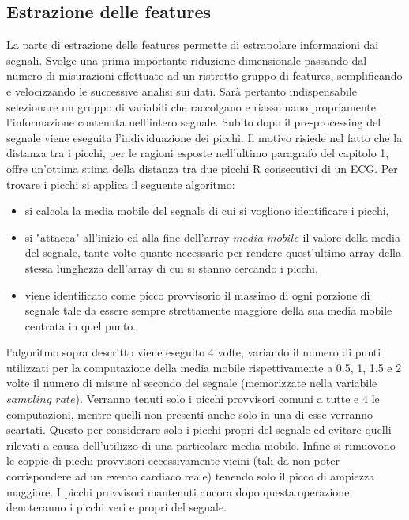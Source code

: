 \documentclass[a4paper, 12pt]{book}
\begin{document}
\subsection{Estrazione delle features}

La parte di estrazione delle features permette di estrapolare informazioni dai segnali.
Svolge una prima importante riduzione dimensionale passando dal numero di misurazioni effettuate ad un ristretto gruppo di features, semplificando e velocizzando le successive analisi sui dati.
Sarà pertanto indispensabile selezionare un gruppo di variabili che raccolgano e riassumano propriamente l'informazione contenuta nell'intero segnale.
Subito dopo il pre-processing del segnale viene eseguita l'individuazione dei picchi.
Il motivo risiede nel fatto che la distanza tra i picchi, per le ragioni esposte nell'ultimo paragrafo del capitolo 1, offre un'ottima stima della distanza tra due picchi R consecutivi di un ECG.
Per trovare i picchi si applica il seguente algoritmo:\begin{itemize}
	\item si calcola la media mobile del segnale di cui si vogliono identificare i 					  picchi,
	\item si "attacca" all'inizio ed alla fine dell'array $media$ $mobile$ il valore 				  della media del segnale, tante volte quante necessarie per rendere 						  quest'ultimo array della stessa lunghezza dell'array di cui si stanno 					  cercando i picchi,
	\item viene identificato come picco provvisorio il massimo di ogni porzione di 					  segnale tale da essere sempre strettamente maggiore della sua media mobile 				  centrata in quel punto.
\end{itemize}
l'algoritmo sopra descritto viene eseguito 4 volte, variando il numero di punti utilizzati per la computazione della media mobile rispettivamente a 0.5, 1, 1.5 e 2 volte il numero di misure al secondo del segnale (memorizzate nella variabile $sampling$ $rate$).
Verranno tenuti solo i picchi provvisori comuni a tutte e 4 le computazioni, mentre quelli non presenti anche solo in una di esse verranno scartati.
Questo per considerare solo i picchi propri del segnale ed evitare quelli rilevati a causa dell'utilizzo di una particolare media mobile.
Infine si rimuovono le coppie di picchi provvisori eccessivamente vicini (tali da non poter corrispondere ad un evento cardiaco reale) tenendo solo il picco di ampiezza maggiore.
I picchi provvisori mantenuti ancora dopo questa operazione denoteranno i picchi veri e propri del segnale.
\end{document}
